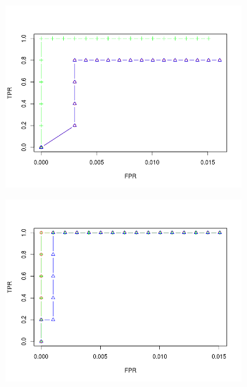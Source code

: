 \documentclass[11pt]{report}\usepackage[utf8]{inputenc}
\begin{document}
\begin{figure}[h]
\begin{subfigure}[b]{0.3\textwidth}
        \includegraphics[width=\textwidth]{../plots/500t03}
        \caption{}
    \end{subfigure}
    \begin{subfigure}[b]{0.3\textwidth}
        \includegraphics[width=\textwidth]{../plots/200t09}
        \caption{}
    \end{subfigure}
    \begin{subfigure}[b]{0.3\textwidth}

\end{subfigure}
\end{figure}
\end{document}
